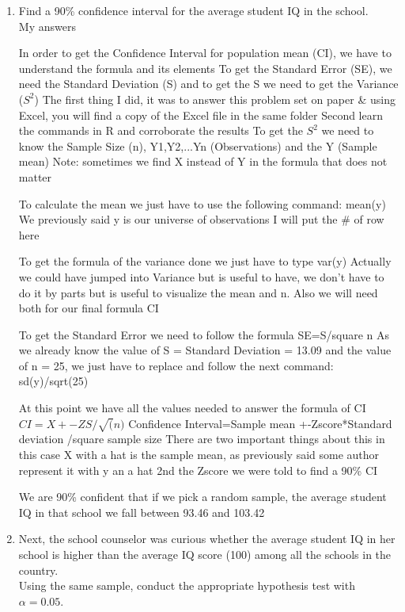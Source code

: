 \documentclass[12pt,letterpaper]{article}
\begin{document}
\begin{enumerate}
	\item Find a 90\% confidence interval for the average student IQ in the school.\\
	

		
	My answers
	
	In order to get the Confidence Interval for population mean (CI), we have to understand the formula and its elements
	To get the Standard Error (SE), we need the Standard Deviation (S) and to get the S we need to get the Variance ($S^2$)
	The first thing I did, it was to answer this problem set on paper \& using Excel, you will find a copy of the Excel file in the same folder
	Second learn the commands in R and corroborate the results
	To get the $S^2$ we need to know the Sample Size (n), Y1,Y2,...Yn (Observations) and the Y (Sample mean)
	Note: sometimes we find X instead of Y in the formula that does not matter
	
	To calculate the mean we just have to use the following command: mean(y)
	We previously said y is our universe of observations I will put the \# of row here
	
	To get the formula of the variance done we just have to type var(y)
	Actually we could have jumped into Variance but is useful to have, we don't have to do it by parts but is useful to visualize the mean and n. Also we will need both for our final formula CI
	
	To get the Standard Error we need to follow the formula SE=S/square n
	As we already know the value of S = Standard Deviation = 13.09 and the value of n = 25, we just have to replace and follow the next command: 	sd(y)/sqrt(25)
	
	At this point we have all the values needed to answer the formula of CI
	$CI=X+-Z S/\sqrt(n)$
	Confidence Interval=Sample mean +-Zscore*Standard deviation /square sample size
	There are two important things about this in this case X with a hat is 
	the sample mean, as previously said some author represent it with y an a hat
	2nd the Zscore we were told to find a 90\% CI
	
	We are 90\% confident that if we pick a random sample, the average student IQ in that school we fall between 93.46 and 103.42
	

	
	\item Next, the school counselor was curious  whether  the average student IQ in her school is higher than the average IQ score (100) among all the schools in the country.\\ 
	
	\noindent Using the same sample, conduct the appropriate hypothesis test with $\alpha=0.05$.
\end{enumerate}
\end{document}

